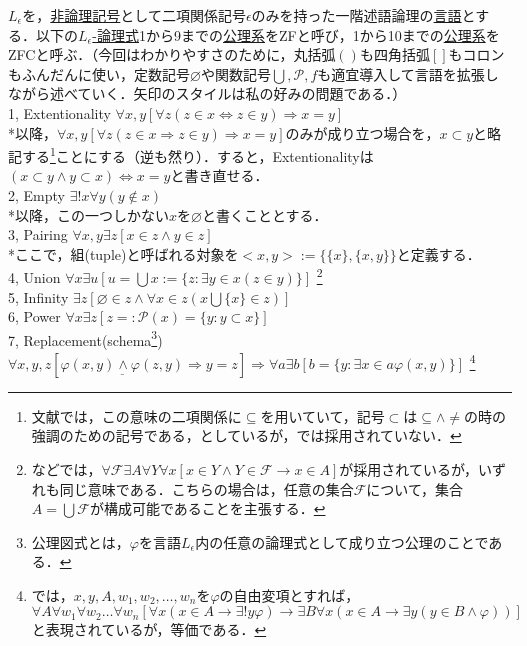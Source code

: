 \documentclass[uplatex, 12pt, a4paper, dvipdfmx]{jsarticle}
\begin{document}
\begin{shadebox}
\begin{definition}
	$L_\epsilon$を，\underline{非論理記号}として二項関係記号$\epsilon$のみを持った一階述語論理の\underline{言語}とする．以下の\underline{$L_\epsilon$-論理式}1から9までの\underline{公理系}をZFと呼び，1から10までの\underline{公理系}をZFCと呼ぶ．（今回はわかりやすさのために，丸括弧$()$も四角括弧$[]$もコロンもふんだんに使い，定数記号$\varnothing$や関数記号$\bigcup , \mathcal{P}, f$も適宜導入して言語を拡張しながら述べていく．矢印のスタイルは私の好みの問題である．）\\
	\rm{1, Extentionality}   $\forall x,y [\forall z(z\in x \Longleftrightarrow z\in y) \Longrightarrow x=y]$\\
	\hspace{5mm}*以降，$\forall x,y [\forall z(z\in x \Longrightarrow z\in y) \Longrightarrow x=y]$のみが成り立つ場合を，$x\subset y$と略記する\footnote{文献\cite{吉田洋一}では，この意味の二項関係に$\subseteq$を用いていて，記号$\subset$は$\subseteq \wedge \neq$の時の強調のための記号である，としているが，\cite{須之内治男}\cite{赤摂也}では採用されていない．}ことにする（逆も然り）．すると，Extentionalityは$(x\subset y \wedge y\subset x)\Longleftrightarrow x=y$と書き直せる．\\
	2, \rm{Empty}   $\exists ! x \forall y (y\notin x)$\\
	\hspace{5mm}*以降，この一つしかない$x$を$\varnothing$と書くこととする．\\
	3, \rm{Pairing}   $\forall x,y \exists z [x\in z \wedge y\in z ]$\\
	\hspace{5mm}*ここで，組(tuple)と呼ばれる対象を$<x,y>:=\{ \{ x\} ,\{ x,y\} \}$と定義する．\\
	4, \rm{Union}  \; $\forall x \exists u [u=\bigcup x := \{ z:\exists y \in x (z\in y)\} ]$ \footnote{\cite{Kunen}などでは，$\forall \mathcal{F} \exists A \forall Y \forall x [x\in Y \wedge Y\in \mathcal{F}\longrightarrow x\in A]$が採用されているが，いずれも同じ意味である．こちらの場合は，任意の集合$\mathcal{F}$について，集合$A=\bigcup \mathcal{F}$が構成可能であることを主張する．} \\
	5, \rm{Infinity}   $\exists z [\varnothing \in z \wedge \forall x \in z (x\bigcup \{ x \} \in z)]$\\
	6, \rm{Power}   $\forall x \exists z [z=:\mathcal{P} (x) = \{ y:y \subset x \} ]$\\
	7, \rm{Replacement(schema\footnote{公理図式とは，$\varphi$を言語$L_\epsilon$内の任意の論理式として成り立つ公理のことである．})}   $\forall x,y,z [\underline{\varphi(x,y) \wedge \varphi (z,y)} \Longrightarrow y=z] \Longrightarrow \forall a \exists b [b=\{ y:\exists x\in a \varphi (x,y)\} ]$ \footnote{\cite{Kunen}では，$x,y,A,w_1,w_2,\dots,w_n$を$\varphi$の自由変項とすれば，$\forall A \forall w_1 \forall w_2 \dots \forall w_n [\forall x (x\in A \longrightarrow \exists ! y \varphi) \longrightarrow \exists B \forall x (x\in A \longrightarrow \exists y (y\in B \wedge \varphi))]$と表現されているが，等価である．} \\

\end{definition}
\end{shadebox}
\end{document}
